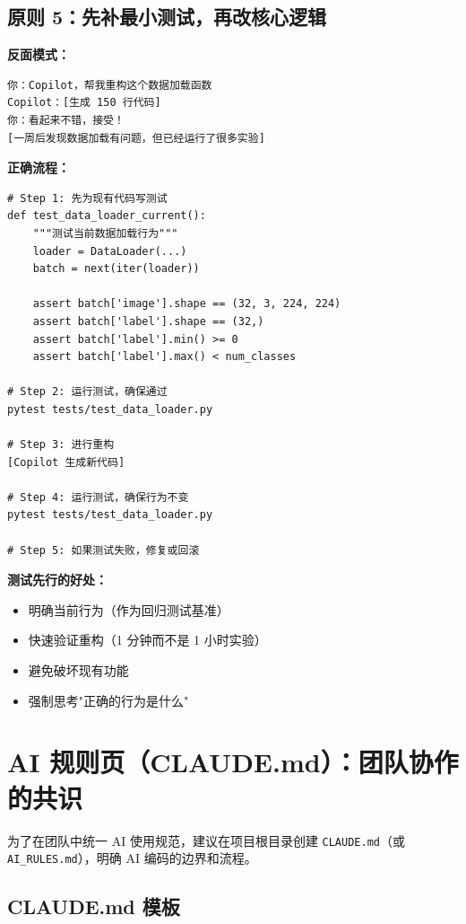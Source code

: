 \subsection{原则 5：先补最小测试，再改核心逻辑}

\textbf{反面模式：}
\begin{verbatim}
你：Copilot，帮我重构这个数据加载函数
Copilot：[生成 150 行代码]
你：看起来不错，接受！
[一周后发现数据加载有问题，但已经运行了很多实验]
\end{verbatim}

\textbf{正确流程：}
\begin{verbatim}
# Step 1: 先为现有代码写测试
def test_data_loader_current():
    """测试当前数据加载行为"""
    loader = DataLoader(...)
    batch = next(iter(loader))

    assert batch['image'].shape == (32, 3, 224, 224)
    assert batch['label'].shape == (32,)
    assert batch['label'].min() >= 0
    assert batch['label'].max() < num_classes

# Step 2: 运行测试，确保通过
pytest tests/test_data_loader.py

# Step 3: 进行重构
[Copilot 生成新代码]

# Step 4: 运行测试，确保行为不变
pytest tests/test_data_loader.py

# Step 5: 如果测试失败，修复或回滚
\end{verbatim}

\textbf{测试先行的好处：}
\begin{itemize}
  \item 明确当前行为（作为回归测试基准）
  \item 快速验证重构（1 分钟而不是 1 小时实验）
  \item 避免破坏现有功能
  \item 强制思考"正确的行为是什么"
\end{itemize}

\section{AI 规则页（CLAUDE.md）：团队协作的共识}

为了在团队中统一 AI 使用规范，建议在项目根目录创建 \texttt{CLAUDE.md}（或 \texttt{AI\_RULES.md}），明确 AI 编码的边界和流程。

\subsection{CLAUDE.md 模板}

